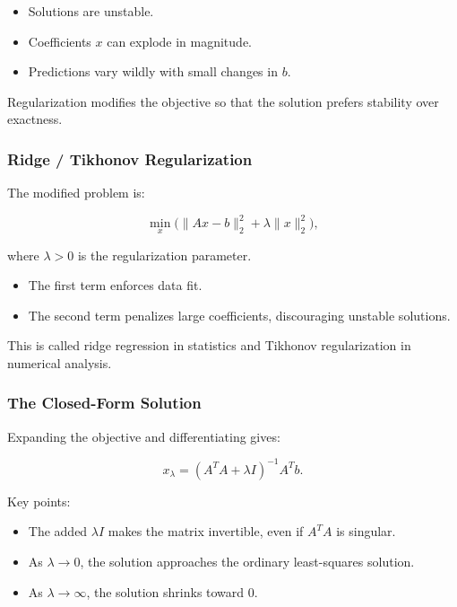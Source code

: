 \documentclass[
  letterpaper,
  DIV=11,
  numbers=noendperiod]{scrreprt}
\providecommand{\tightlist}{%
  \setlength{\itemsep}{0pt}\setlength{\parskip}{0pt}}
\begin{document}
\begin{itemize}
\tightlist
\item
  Solutions are unstable.
\item
  Coefficients \(x\) can explode in magnitude.
\item
  Predictions vary wildly with small changes in \(b\).
\end{itemize}

Regularization modifies the objective so that the solution prefers
stability over exactness.

\subsubsection{Ridge / Tikhonov
Regularization}\label{ridge-tikhonov-regularization}

The modified problem is:

\[
\min_x \big( \|Ax - b\|_2^2 + \lambda \|x\|_2^2 \big),
\]

where \(\lambda > 0\) is the regularization parameter.

\begin{itemize}
\tightlist
\item
  The first term enforces data fit.
\item
  The second term penalizes large coefficients, discouraging unstable
  solutions.
\end{itemize}

This is called ridge regression in statistics and Tikhonov
regularization in numerical analysis.

\subsubsection{The Closed-Form Solution}\label{the-closed-form-solution}

Expanding the objective and differentiating gives:

\[
x_\lambda = (A^T A + \lambda I)^{-1} A^T b.
\]

Key points:

\begin{itemize}
\tightlist
\item
  The added \(\lambda I\) makes the matrix invertible, even if \(A^T A\)
  is singular.
\item
  As \(\lambda \to 0\), the solution approaches the ordinary
  least-squares solution.
\item
  As \(\lambda \to \infty\), the solution shrinks toward 0.
\end{itemize}
\end{document}
